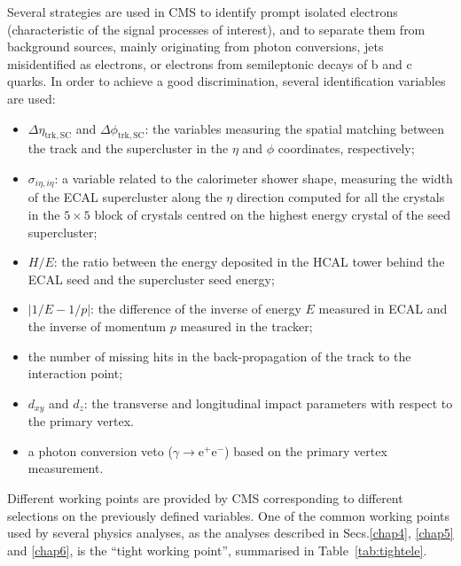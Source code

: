 Several strategies are used in CMS to identify prompt isolated electrons (characteristic of the signal processes of interest), and to separate them from background sources, mainly originating from photon conversions, jets misidentified as electrons, or electrons from semileptonic decays of b and c quarks. In order to achieve a good discrimination, several identification variables are used:
\begin{itemize}
\item $\Delta\eta_\mathrm{trk,SC}$ and $\Delta\phi_\mathrm{trk,SC}$: the variables measuring the spatial matching between the track and the supercluster in the $\eta$ and $\phi$ coordinates, respectively;
\item $\sigma_{i\eta,i\eta}$: a variable related to the calorimeter shower shape, measuring the width of the ECAL supercluster along the $\eta$ direction computed for all the crystals in the $5
\times 5$ block of crystals centred on the highest energy crystal of the seed supercluster;
\item $H/E$: the ratio between the energy deposited in the HCAL tower behind the ECAL seed and the supercluster seed energy;
\item $|1/E - 1/p|$: the difference of the inverse of energy $E$ measured in ECAL and the inverse of momentum $p$ measured in the tracker;
\item the number of missing hits in the back-propagation of the track to the interaction point;
\item $d_{xy}$ and $d_z$: the transverse and longitudinal impact parameters with respect to the primary vertex.
\item a photon conversion veto ($\gamma \to \mathrm{e^+ e^-}$) based on the primary vertex measurement.
\end{itemize}

Different working points are provided by CMS corresponding to different selections on the previously defined variables. One of the common working points used by several physics analyses, as the \hww analyses described in Secs.\ref{chap4}, \ref{chap5} and \ref{chap6}, is the ``tight working point'', summarised in Table~\ref{tab:tightele}.


